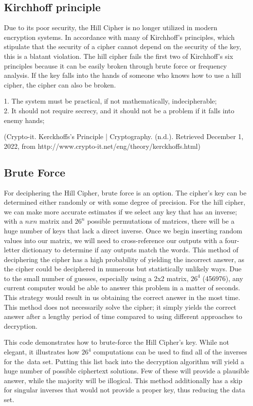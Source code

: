 \documentclass{article}
\begin{document}
\subsection*{Kirchhoff principle}
Due to its poor security, the Hill Cipher is no longer utilized in modern encryption systems. In accordance with many of Kirchhoff's principles, which stipulate that the security of a cipher cannot depend on the security of the key, this is a blatant violation. The hill cipher fails the first two of Kirchhoff's six principles because it can be easily broken through brute force or frequency analysis. If the key falls into the hands of someone who knows how to use a hill cipher, the cipher can also be broken.
\begin{center}
    

1. The system must be practical, if not mathematically, indecipherable;
\\
2. It should not require secrecy, and it should not be a problem if it falls into enemy hands;\end{center}
\begin{center}
(Crypto-it. Kerckhoffs's Principle | Cryptography. (n.d.). Retrieved December 1, 2022, from http://www.crypto-it.net/eng/theory/kerckhoffs.html)
\end{center}


\subsection*{Brute Force}
\par For deciphering the Hill Cipher, brute force is an option. The cipher's key can be determined either randomly or with some degree of precision. For the hill cipher, we can make more accurate estimates if we select any key that has an inverse; with a $nxn$ matrix and $26^n$ possible permutations of matrices, there will be a huge number of keys that lack a direct inverse. Once we begin inserting random values into our matrix, we will need to cross-reference our outputs with a four-letter dictionary to determine if any outputs match the words. This method of deciphering the cipher has a high probability of yielding the incorrect answer, as the cipher could be deciphered in numerous but statistically unlikely ways. Due to the small number of guesses, especially using a 2x2 matrix, $26^4$ (456976), any current computer would be able to answer this problem in a matter of seconds. This strategy would result in us obtaining the correct answer in the most time. This method does not necessarily solve the cipher; it simply yields the correct answer after a lengthy period of time compared to using different approaches to decryption.
\par
 This code demonstrates how to brute-force the Hill Cipher's key. While not elegant, it illustrates how $26^4$ computations can be used to find all of the inverses for the data set. Putting this list back into the decryption algorithm will yield a huge number of possible ciphertext solutions. Few of these will provide a plausible answer, while the majority will be illogical. This method additionally has a skip for singular inverses that would not provide a proper key, thus reducing the data set.
\end{document}
